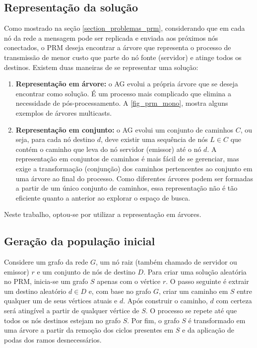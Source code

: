 \subsection{Representação da solução}

Como mostrado na seção \ref{section_problemas_prm}, considerando que em cada nó da rede a mensagem pode ser replicada e enviada aos próximos nós conectados, o PRM deseja encontrar a árvore que representa o processo de transmissão de menor custo que parte do nó fonte (servidor) e atinge todos os destinos. Existem duas maneiras de se representar uma solução:

\begin{enumerate}
	\item \textbf{Representação em árvore:} \cite{Bueno2010} o AG evolui a própria árvore que se deseja encontrar como solução. É um processo mais complicado que elimina a necessidade de pós-processamento. A \autoref{fig_prm_mono}, mostra alguns exemplos de árvores multicasts.
	\item \textbf{Representação em conjunto:} \cite{Baran2004} o AG evolui um conjunto de caminhos $C$, ou seja, para cada nó destino $d$, deve existir uma sequência de nós $L \in C$ que contém o caminho que leva do nó servidor (emissor) até o nó $d$. A representação em conjuntos de caminhos é mais fácil de se gerenciar, mas exige a transformação (conjunção) dos caminhos pertencentes ao conjunto em uma árvore  ao final do processo. Como diferentes árvores podem ser formadas a partir de um único conjunto de caminhos, essa representação não é tão eficiente quanto a anterior ao explorar o espaço de busca.
\end{enumerate}

Neste trabalho, optou-se por utilizar a representação em árvores.

\subsection{Geração da população inicial}

Considere um grafo da rede $G$, um nó raiz (também chamado de servidor ou emissor) $r$ e um conjunto de nós de destino $D$. Para criar uma solução aleatória no PRM, inicia-se um grafo $S$ apenas com o vértice $r$. O passo seguinte é extrair um destino aleatório $d \in D$ e, com base no grafo $G$, criar um caminho em $S$ entre qualquer um de seus vértices atuais e $d$. Após construir o caminho, $d$ com certeza será atingível a partir de qualquer vértice de $S$. O processo se repete até que todos os nós destinos estejam no grafo $S$. Por fim, o grafo $S$ é transformado em uma árvore a partir da remoção dos ciclos presentes em $S$ e da aplicação de podas dos ramos desnecessários.

